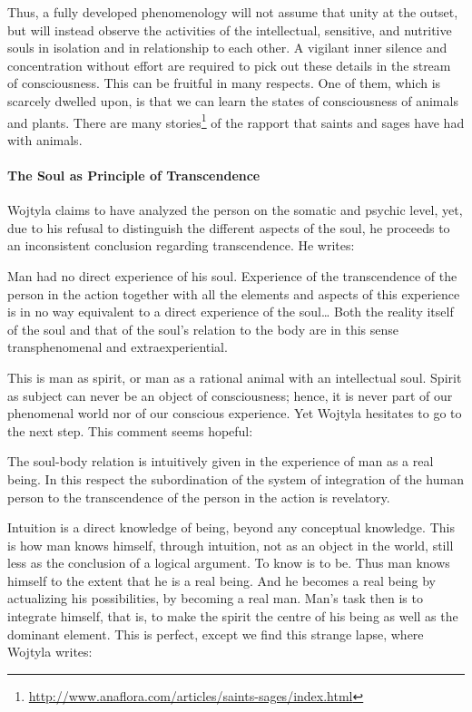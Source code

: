 Thus, a fully developed phenomenology will not assume that unity at the outset, but will instead observe the activities of the intellectual, sensitive, and nutritive souls in isolation and in relationship to each other. A vigilant inner silence and concentration without effort are required to pick out these details in the stream of consciousness. This can be fruitful in many respects. One of them, which is scarcely dwelled upon, is that we can learn the states of consciousness of animals and plants. There are many stories\footnote{\url{http://www.anaflora.com/articles/saints-sages/index.html}} of the rapport that saints and sages have had with animals.

\paragraph{The Soul as Principle of Transcendence}
Wojtyla claims to have analyzed the person on the somatic and psychic level, yet, due to his refusal to distinguish the different aspects of the soul, he proceeds to an inconsistent conclusion regarding transcendence. He writes:

\begin{quotex}
Man had no direct experience of his soul. Experience of the transcendence of the person in the action together with all the elements and aspects of this experience is in no way equivalent to a direct experience of the soul… Both the reality itself of the soul and that of the soul's relation to the body are in this sense transphenomenal and extraexperiential. 

\end{quotex}
This is man as spirit, or man as a rational animal with an intellectual soul. Spirit as subject can never be an object of consciousness; hence, it is never part of our phenomenal world nor of our conscious experience. Yet Wojtyla hesitates to go to the next step. This comment seems hopeful:

\begin{quotex}
The soul-body relation is intuitively given in the experience of man as a real being. In this respect the subordination of the system of integration of the human person to the transcendence of the person in the action is revelatory. 

\end{quotex}
Intuition is a direct knowledge of being, beyond any conceptual knowledge. This is how man knows himself, through intuition, not as an object in the world, still less as the conclusion of a logical argument. To know is to be. Thus man knows himself to the extent that he is a real being. And he becomes a real being by actualizing his possibilities, by becoming a real man. Man's task then is to integrate himself, that is, to make the spirit the centre of his being as well as the dominant element. This is perfect, except we find this strange lapse, where Wojtyla writes:

